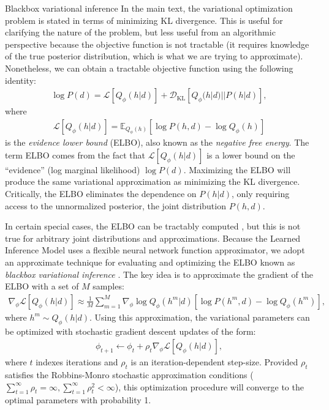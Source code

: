 Blackbox variational inference
In the main text, the variational optimization problem is stated in terms of minimizing KL divergence. This is useful for clarifying the nature of the problem, but less useful from an algorithmic perspective because the objective function is not tractable (it requires knowledge of the true posterior distribution, which is what we are trying to approximate). Nonetheless, we can obtain a tractable objective function using the following identity:
\begin{align}
    \log P(d) = \mathcal{L}[Q_\phi(h|d)] + \mathcal{D}_\text{KL}[Q_\phi(h|d)||P(h|d)],
\end{align}
where
\begin{align}
    \mathcal{L}[Q_\phi(h|d)] = \mathbb{E}_{Q_\phi(h)} \left[ \log P(h,d) - \log Q_\phi(h) \right]
\end{align}
is the \emph{evidence lower bound} (ELBO), also known as the \emph{negative free energy}. The term ELBO comes from the fact that $\mathcal{L}[Q_\phi(h|d)]$ is a lower bound on the ``evidence'' (log marginal likelihood) $\log P(d)$. Maximizing the ELBO will produce the same variational approximation as minimizing the KL divergence. Critically, the ELBO eliminates the dependence on $P(h|d)$, only requiring access to the unnormalized posterior, the joint distribution $P(h,d)$.

In certain special cases, the ELBO can be tractably computed \citep[see][]{jordan1999introduction}, but this is not true for arbitrary joint distributions and approximations. Because the Learned Inference Model uses a flexible neural network function approximator, we adopt an approximate technique for evaluating and optimizing the ELBO known as \emph{blackbox variational inference} \citep{ranganath2014black}. The key idea is to approximate the gradient of the ELBO with a set of $M$ samples:
\begin{align}
    \nabla_\phi \mathcal{L}[Q_\phi(h|d)] \approx \frac{1}{M} \sum_{m=1}^M \nabla_\phi \log Q_\phi(h^m|d) \left[ \log P(h^m,d) - \log Q_\phi(h^m) \right],
\end{align}
where $h^m \sim Q_\phi(h|d)$. Using this approximation, the variational parameters can be optimized with stochastic gradient descent updates of the form:
\begin{align}
    \phi_{t+1} \leftarrow \phi_t + \rho_t \nabla_\phi \mathcal{L}[Q_\phi(h|d)],
\end{align}
where $t$ indexes iterations and $\rho_t$ is an iteration-dependent step-size. Provided $\rho_t$ satisfies the Robbins-Monro stochastic approximation conditions ($\sum_{t=1}^\infty \rho_t = \infty, \sum_{t=1}^\infty \rho_t^2 < \infty$), this optimization procedure will converge to the optimal parameters with probability 1.
